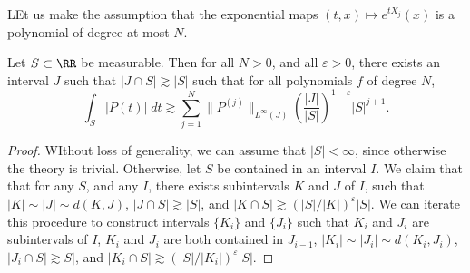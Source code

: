 LEt us make the assumption that the exponential maps $(t,x) \mapsto e^{t X_j}(x)$ is a polynomial of degree at most $N$.

\begin{theorem}
    Let $S \subset \RR$ be measurable. Then for all $N > 0$, and all $\varepsilon > 0$, there exists an interval $J$ such that $|J \cap S| \gtrsim |S|$ such that for all polynomials $f$ of degree $N$,
    \[ \int_S |P(t)|\; dt \gtrsim \sum_{j = 1}^N \| P^{(j)} \|_{L^\infty(J)} \left( \frac{|J|}{|S|} \right)^{1 - \varepsilon} |S|^{j + 1}. \]
\end{theorem}
\begin{proof}
    WIthout loss of generality, we can assume that $|S| < \infty$, since otherwise the theory is trivial. Otherwise, let $S$ be contained in an interval $I$. We claim that that for any $S$, and any $I$, there exists subintervals $K$ and $J$ of $I$, such that $|K| \sim |J| \sim d(K,J)$, $|J \cap S| \gtrsim |S|$, and $|K \cap S| \gtrsim (|S| / |K|)^\varepsilon |S|$. We can iterate this procedure to construct intervals $\{ K_i \}$ and $\{ J_i \}$ such that $K_i$ and $J_i$ are subintervals of $I$, $K_i$ and $J_i$ are both contained in $J_{i-1}$, $|K_i| \sim |J_i| \sim d(K_i,J_i)$, $|J_i \cap S| \gtrsim S|$, and $|K_i \cap S| \gtrsim (|S| / |K_i|)^\varepsilon |S|$.


\end{proof}
